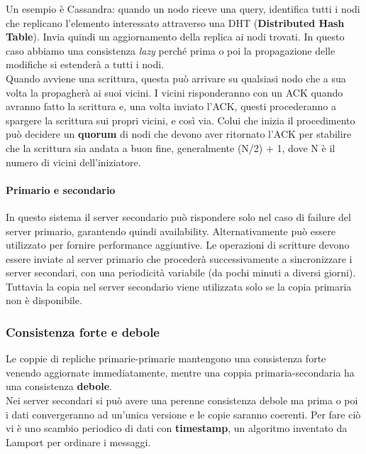 \documentclass{article}
\begin{document}
		Un esempio è Cassandra: quando un nodo riceve una query, identifica tutti i nodi che replicano l'elemento interessato attraverso una DHT (\textbf{Distributed Hash Table}). Invia quindi un aggiornamento della replica ai nodi trovati. In questo caso abbiamo una consistenza \textit{lazy} perché prima o poi la propagazione delle modifiche si estenderà a tutti i nodi.\\
		
		Quando avviene una scrittura, questa può arrivare su qualsiasi nodo che a sua volta la propagherà ai suoi vicini. I vicini risponderanno con un ACK quando avranno fatto la scrittura e, una volta inviato l’ACK, questi procederanno a spargere la scrittura sui propri vicini, e così via. Colui che inizia il procedimento può decidere un \textbf{quorum} di nodi che devono aver ritornato l’ACK per stabilire che la scrittura sia andata a buon fine, generalmente (N/2) + 1, dove N è il numero di vicini dell’iniziatore.
				
		\paragraph{Primario e secondario}
		In questo sistema il server secondario può rispondere solo nel caso di failure del server primario, garantendo quindi availability. Alternativamente può essere utilizzato per fornire performance aggiuntive. Le operazioni di scritture devono essere inviate al server primario che procederà successivamente a sincronizzare i server secondari, con una periodicità variabile (da pochi minuti a diversi giorni). Tuttavia la copia nel server secondario viene utilizzata solo se la copia primaria non è disponibile.
		
		\subsubsection{Consistenza forte e debole}
		Le coppie di repliche primarie-primarie mantengono una consistenza forte venendo aggiornate immediatamente, mentre una coppia primaria-secondaria ha una consistenza \textbf{debole}.\\
		Nei server secondari si può avere una perenne consistenza debole ma prima o poi i dati convergeranno ad un'unica versione e le copie saranno coerenti. Per fare ciò vi è uno scambio periodico di dati con \textbf{timestamp}, un algoritmo inventato da Lamport per ordinare i messaggi.\\
		
\end{document}
